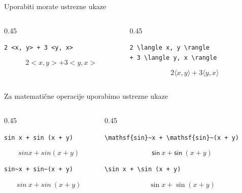 \documentclass[aspectratio=169]{beamer}
\begin{document}
\begin{frame}[fragile]{Uporabiti morate ustrezne ukaze}
  \begin{columns}[t]
    \begin{column}{0.45\textwidth}
      \begin{slaboenv}
        \begin{verbatim}
2 <x, y> + 3 <y, x>
        \end{verbatim}
        \[ 2 <x, y> + 3 <y, x> \]
      \end{slaboenv}
    \end{column}
    \begin{column}{0.45\textwidth}
      \begin{dobroenv}
        \begin{verbatim}
2 \langle x, y \rangle
+ 3 \langle y, x \rangle
        \end{verbatim}
        \[ 2 \langle x, y \rangle + 3 \langle y, x \rangle \]
      \end{dobroenv}
    \end{column}
  \end{columns}
\end{frame}

\begin{frame}[fragile]{Za matematične operacije uporabimo ustrezne ukaze}
  \begin{columns}[t]
    \begin{column}{0.45\textwidth}
      \begin{slaboenv}
        \begin{verbatim}
sin x + sin (x + y)
        \end{verbatim}
        \[ sin x + sin (x + y) \]
      \end{slaboenv}
      \begin{slaboenv}
        \begin{verbatim}
sin~x + sin~(x + y)
        \end{verbatim}
        \[ sin~x + sin~(x + y) \]
      \end{slaboenv}
    \end{column}
    \begin{column}{0.45\textwidth}
      \begin{slaboenv}
        \begin{verbatim}
\mathsf{sin}~x + \mathsf{sin}~(x + y)
        \end{verbatim}
        \[ \mathsf{sin}~x + \mathsf{sin}~(x + y) \]
      \end{slaboenv}
      \begin{dobroenv}
        \begin{verbatim}
\sin x + \sin (x + y)
        \end{verbatim}
        \[ \sin x + \sin (x + y) \]
      \end{dobroenv}
    \end{column}
  \end{columns}
\end{frame}
\end{document}
